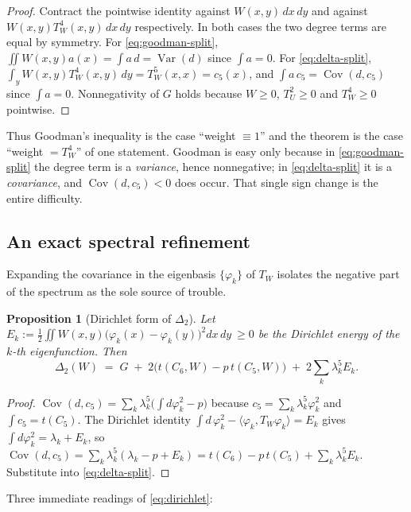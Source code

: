 \documentclass[11pt]{article}
\newtheorem{proposition}[theorem]{Proposition}
\theoremstyle{definition}
\newcommand{\Var}{\operatorname{Var}}
\newcommand{\Cov}{\operatorname{Cov}}
\newcommand{\tw}{T_W}
\newcommand{\tu}{T_U}
\begin{document}
\begin{proof}
Contract the pointwise identity against $W(x,y)\,dx\,dy$ and against
$W(x,y)\tw^4(x,y)\,dx\,dy$ respectively.  In both cases the two degree terms are
equal by symmetry.  For \eqref{eq:goodman-split},
$\iint W(x,y)a(x)=\int a\,d=\Var(d)$ since $\int a=0$.  For
\eqref{eq:delta-split}, $\int_yW(x,y)\tw^4(x,y)\,dy=\tw^5(x,x)=c_5(x)$, and
$\int a\,c_5=\Cov(d,c_5)$ since $\int a=0$.  Nonnegativity of $G$ holds because
$W\ge0$, $\tu^2\ge0$ and $\tw^4\ge0$ pointwise.
\end{proof}

Thus Goodman's inequality is the case ``weight $\equiv1$'' and the theorem is
the case ``weight $=\tw^4$'' of one statement.  Goodman is easy only because in
\eqref{eq:goodman-split} the degree term is a \emph{variance}, hence
nonnegative; in \eqref{eq:delta-split} it is a \emph{covariance}, and
$\Cov(d,c_5)<0$ does occur.  That single sign change is the entire difficulty.

\subsection{An exact spectral refinement}

Expanding the covariance in the eigenbasis $\{\varphi_k\}$ of $\tw$ isolates the
negative part of the spectrum as the sole source of trouble.

\begin{proposition}[Dirichlet form of $\Delta_2$]\label{prop:dirichlet}
Let $E_k:=\tfrac12\iint W(x,y)\big(\varphi_k(x)-\varphi_k(y)\big)^2dx\,dy\ \ge0$
be the Dirichlet energy of the $k$-th eigenfunction.  Then
\begin{equation}\label{eq:dirichlet}
  \Delta_2(W)\;=\;G\;+\;2\big(t(C_6,W)-p\,t(C_5,W)\big)\;+\;2\sum_k\lambda_k^5E_k .
\end{equation}
\end{proposition}

\begin{proof}
$\Cov(d,c_5)=\sum_k\lambda_k^5\big(\int d\varphi_k^2-p\big)$ because
$c_5=\sum_k\lambda_k^5\varphi_k^2$ and $\int c_5=t(C_5)$.  The Dirichlet
identity $\int d\,\varphi_k^2-\langle\varphi_k,\tw\varphi_k\rangle=E_k$ gives
$\int d\varphi_k^2=\lambda_k+E_k$, so
$\Cov(d,c_5)=\sum_k\lambda_k^5(\lambda_k-p+E_k)
=t(C_6)-p\,t(C_5)+\sum_k\lambda_k^5E_k$.  Substitute into
\eqref{eq:delta-split}.
\end{proof}

Three immediate readings of \eqref{eq:dirichlet}:
\end{document}
